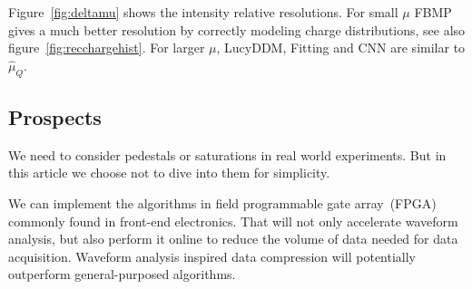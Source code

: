Figure~\ref{fig:deltamu} shows the intensity relative resolutions.  For small $\mu$ FBMP gives a much better resolution by correctly modeling charge distributions, see also figure~\ref{fig:recchargehist}.  For larger $\mu$, LucyDDM, Fitting and CNN are similar to $\hat{\mu}_Q$.


\subsection{Prospects}
\label{sec:prospects}

We need to consider pedestals or saturations in real world experiments.  But in this article we choose not to dive into them for simplicity.

We can implement the algorithms in field programmable gate array~(FPGA) commonly found in front-end electronics.  That will not only accelerate waveform analysis, but also perform it online to reduce the volume of data needed for data acquisition.  Waveform analysis inspired data compression will potentially outperform general-purposed algorithms.
